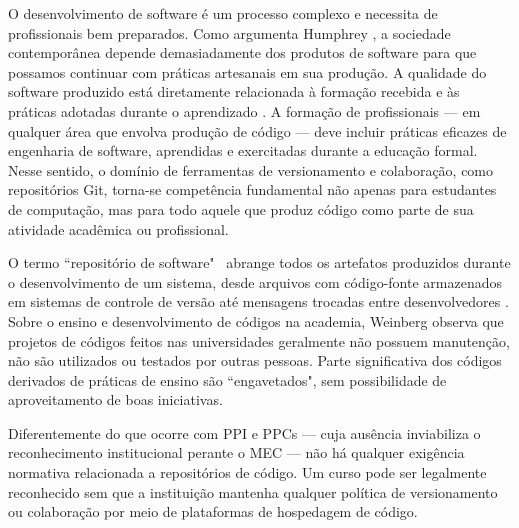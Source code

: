\documentclass[english, spanish, brazilian]{RBIEarticle}
\begin{document}
	O desenvolvimento de software é um processo complexo e necessita de profissionais bem preparados. Como argumenta Humphrey \cite{barr2018}, a sociedade contemporânea depende demasiadamente dos produtos de software para que possamos continuar com práticas artesanais em sua produção. A qualidade do software produzido está diretamente relacionada à formação recebida e às práticas adotadas durante o aprendizado \cite{sommerville2011}. A formação de profissionais — em qualquer área que envolva produção de código — deve incluir práticas eficazes de engenharia de software, aprendidas e exercitadas durante a educação formal. Nesse sentido, o domínio de ferramentas de versionamento e colaboração, como repositórios Git, torna-se competência fundamental não apenas para estudantes de computação, mas para todo aquele que produz código como parte de sua atividade acadêmica ou profissional.
	
	O termo ``repositório de software"~ abrange todos os artefatos produzidos durante o desenvolvimento de um sistema, desde arquivos com código-fonte armazenados em sistemas de controle de versão até mensagens trocadas entre desenvolvedores \cite{sokol2013}. Sobre o ensino e desenvolvimento de códigos na academia, Weinberg \cite{barr2018} observa que projetos de códigos feitos nas universidades geralmente não possuem manutenção, não são utilizados ou testados por outras pessoas. Parte significativa dos códigos derivados de práticas de ensino são ``engavetados", sem possibilidade de aproveitamento de boas iniciativas.
	
	Diferentemente do que ocorre com PPI e PPCs — cuja ausência inviabiliza o reconhecimento institucional perante o MEC — não há qualquer exigência normativa relacionada a repositórios de código. Um curso pode ser legalmente reconhecido sem que a instituição mantenha qualquer política de versionamento ou colaboração por meio de plataformas de hospedagem de código.
	
\end{document}
